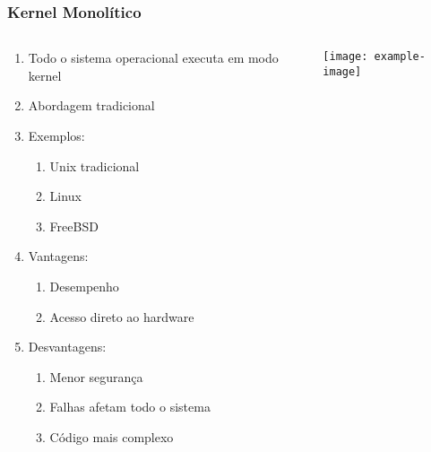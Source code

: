 \documentclass{beamer}
\begin{document}
\begin{frame}[fragile]
\frametitle{Kernel Monolítico}

\begin{columns}
    \begin{column}{0.5\textwidth}
        \begin{enumerate}
            \item Todo o sistema operacional executa em modo kernel
            \item Abordagem tradicional
            \item Exemplos:
            \begin{enumerate}
                \item Unix tradicional
                \item Linux
                \item FreeBSD
            \end{enumerate}
            \item Vantagens:
            \begin{enumerate}
                \item Desempenho
                \item Acesso direto ao hardware
            \end{enumerate}
            \item Desvantagens:
            \begin{enumerate}
                \item Menor segurança
                \item Falhas afetam todo o sistema
                \item Código mais complexo
            \end{enumerate}
        \end{enumerate}
    \end{column}
    
    \begin{column}{0.5\textwidth}
        \begin{center}
            \texttt{[image: example-image]}
        \end{center}
    \end{column}
\end{columns}
\end{frame}
\end{document}
